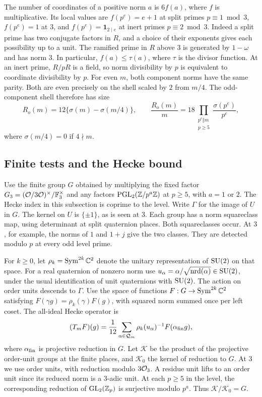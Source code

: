 The number of coordinates of a positive norm \(a\) is \(6f(a)\),
where \(f\) is multiplicative. Its local values are \(f(p^e)=e+1\)
at split primes \(p\equiv1\bmod3\), \(f(p^e)=1\) at \(3\), and
\(f(p^e)=\mathbf1_{2\mid e}\) at inert primes \(p\equiv2\bmod3\).
Indeed a split prime has two conjugate factors in \(R\), and a choice
of their exponents gives each possibility up to a unit. The ramified
prime in \(R\) above \(3\) is generated by \(1-\omega\) and has norm
\(3\). In particular, \(f(a)\le\tau(a)\), where \(\tau\) is the
divisor function. At an inert prime, \(R/pR\) is a field, so norm
divisibility by \(p\) is equivalent to coordinate divisibility by
\(p\). For even \(m\), both component norms have the same parity.
Both are even precisely on the shell scaled by \(2\) from \(m/4\).
The odd-component shell therefore has size
\begin{equation}\label{eq:odd-shell}
 R_o(m)=12\{\sigma(m)-\sigma(m/4)\},\qquad
 \frac{R_o(m)}m=18\prod_{\substack{p^e\Vert m\\p\ge5}}
                            \frac{\sigma(p^e)}{p^e},
\end{equation}
where \(\sigma(m/4)=0\) if \(4\nmid m\).

\subsection{Finite tests and the Hecke bound}
Use the finite group \(G\) obtained by multiplying the fixed factor
\(G_3=(\mathcal O/3\mathcal O)^\times/\mathbb F_3^\times\) and any factors
\(\operatorname{PGL}_2(\mathbb Z/p^a\mathbb Z)\) at \(p\ge5\), with \(a=1\) or \(2\).
The Hecke index in this subsection is coprime to the level.
Write \(\Gamma\) for the image of \(U\) in \(G\).
The kernel on \(U\) is \(\{\pm1\}\), as is seen at \(3\).
Each group has a norm squareclass map, using
determinant at split quaternion places. Both squareclasses occur.
At \(3\), for example, the norms of \(1\) and \(1+j\) give the two
classes. They are detected modulo \(p\) at every odd level prime.

For \(k\ge0\), let \(\rho_k=\operatorname{Sym}^{2k}\mathbb C^2\) denote the unitary
representation of \(\operatorname{SU}(2)\) on that space. For a real quaternion
of nonzero norm use \(u_\alpha=\alpha/\sqrt{\operatorname{nrd}(\alpha)}\in\operatorname{SU}(2)\),
under the usual identification of unit quaternions with
\(\operatorname{SU}(2)\). The action on order units descends to \(\Gamma\).
Use the space of functions \(F:G\to\operatorname{Sym}^{2k}\mathbb C^2\) satisfying
\(F(\gamma g)=\rho_k(\gamma)F(g)\), with squared norm summed once
per left coset. The all-ideal Hecke operator is
\begin{equation}\label{eq:hecke}
 (T_m F)(g)=\frac1{12}\sum_{\alpha\in\mathcal Q_m}
                 \rho_k(u_\alpha)^{-1} F(\alpha_{\rm fin} g),
\end{equation}
where \(\alpha_{\rm fin}\) is projective reduction in \(G\).
Let \(\mathcal K\) be the product of the projective order-unit
groups at the finite places, and \(\mathcal K_0\) the kernel of
reduction to \(G\). At \(3\) we use order units, with reduction
modulo \(3\mathcal O_3\). A residue unit lifts to an order unit since its
reduced norm is a \(3\)-adic unit. At each \(p\ge5\) in the level,
the corresponding reduction of \(\mathrm{GL}_2(\mathbb Z_p)\) is
surjective modulo \(p^a\). Thus \(\mathcal K/\mathcal K_0=G\).

